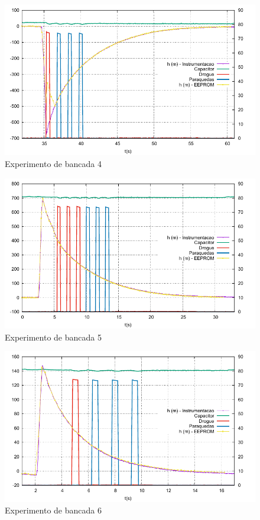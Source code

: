 \documentclass[12pt,a4paper]{article}
\begin{document}
\begin{figure}[!ht]
	\centering
	\includegraphics[width=\textwidth]{./data/exp-v1.5.5/exp04/fig}
	\caption{Experimento de bancada  4}
	\label{fig:exp04}
\end{figure}
\begin{figure}[!ht]
	\centering
	\includegraphics[width=\textwidth]{./data/exp-v1.5.5/exp05/fig}
	\caption{Experimento de bancada  5}
	\label{fig:exp05}
\end{figure}
\begin{figure}[!ht]
	\centering
	\includegraphics[width=\textwidth]{./data/exp-v1.5.5/exp06/fig}
	\caption{Experimento de bancada  6}
	\label{fig:exp06}
\end{figure}
\end{document}

